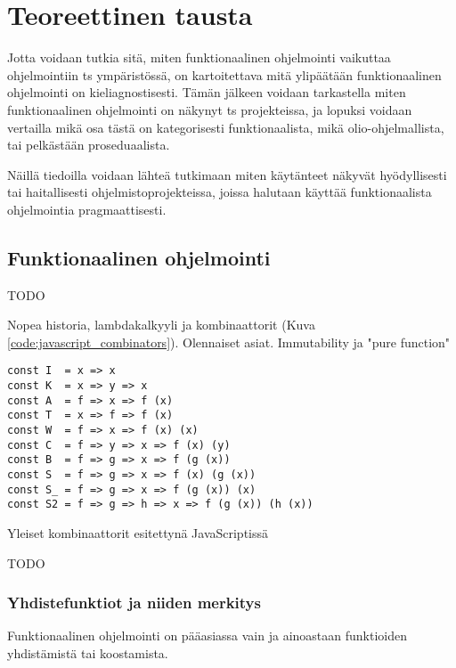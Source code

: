 \vspace{21.5pt}
\chapter{Teoreettinen tausta}

Jotta voidaan tutkia sitä, miten funktionaalinen ohjelmointi vaikuttaa ohjelmointiin \gls{ts} ympäristössä, on kartoitettava mitä ylipäätään funktionaalinen ohjelmointi on kieliagnostisesti. Tämän jälkeen voidaan tarkastella miten funktionaalinen ohjelmointi on näkynyt \gls{ts} projekteissa, ja lopuksi voidaan vertailla mikä osa tästä on kategorisesti funktionaalista, mikä olio-ohjelmallista, tai pelkästään proseduaalista.

Näillä tiedoilla voidaan lähteä tutkimaan miten käytänteet näkyvät hyödyllisesti tai haitallisesti ohjelmistoprojekteissa, joissa halutaan käyttää funktionaalista ohjelmointia pragmaattisesti.

\section{Funktionaalinen ohjelmointi}

TODO

Nopea historia, lambdakalkyyli ja kombinaattorit (Kuva \ref{code:javascript_combinators}). Olennaiset asiat. Immutability ja "pure function"

\begin{code}
  \begin{verbatim}
const I  = x => x
const K  = x => y => x
const A  = f => x => f (x)
const T  = x => f => f (x)
const W  = f => x => f (x) (x)
const C  = f => y => x => f (x) (y)
const B  = f => g => x => f (g (x))
const S  = f => g => x => f (x) (g (x))
const S_ = f => g => x => f (g (x)) (x)
const S2 = f => g => h => x => f (g (x)) (h (x))
\end{verbatim}
  \caption{Yleiset kombinaattorit esitettynä JavaScriptissä \cite{javascript_combinators}}
  \label{code:javascript_combinators}
\end{code}

TODO

\subsection{Yhdistefunktiot ja niiden merkitys}

Funktionaalinen ohjelmointi on pääasiassa vain ja ainoastaan funktioiden yhdistämistä tai koostamista.


